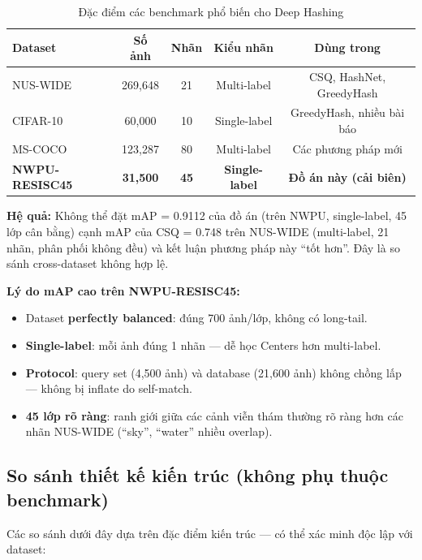 \documentclass[13pt,a4paper]{article}
\begin{document}
\begin{table}[H]
\centering
\caption{Đặc điểm các benchmark phổ biến cho Deep Hashing}
\label{tab:benchmark_comparison}
\begin{tabular}{lcccc}
\toprule
\textbf{Dataset} & \textbf{Số ảnh} & \textbf{Nhãn} & \textbf{Kiểu nhãn} & \textbf{Dùng trong}\\
\midrule
NUS-WIDE        & 269{,}648 & 21  & Multi-label & CSQ, HashNet, GreedyHash \\
CIFAR-10        & 60{,}000  & 10  & Single-label & GreedyHash, nhiều bài báo \\
MS-COCO         & 123{,}287 & 80  & Multi-label & Các phương pháp mới \\
\textbf{NWPU-RESISC45} & \textbf{31{,}500} & \textbf{45} & \textbf{Single-label} & \textbf{Đồ án này (cải biên)} \\
\bottomrule
\end{tabular}
\end{table}

\textbf{Hệ quả:} Không thể đặt mAP = 0.9112 của đồ án (trên NWPU, single-label, 45 lớp cân bằng) cạnh mAP của CSQ = 0.748 trên NUS-WIDE (multi-label, 21 nhãn, phân phối không đều) và kết luận phương pháp này ``tốt hơn''. Đây là so sánh cross-dataset không hợp lệ.

\textbf{Lý do mAP cao trên NWPU-RESISC45:}
\begin{itemize}
    \item Dataset \textbf{perfectly balanced}: đúng 700 ảnh/lớp, không có long-tail.
    \item \textbf{Single-label}: mỗi ảnh đúng 1 nhãn --- dễ học Centers hơn multi-label.
    \item \textbf{Protocol}: query set (4{,}500 ảnh) và database (21{,}600 ảnh) không chồng lấp --- không bị inflate do self-match.
    \item \textbf{45 lớp rõ ràng}: ranh giới giữa các cảnh viễn thám thường rõ ràng hơn các nhãn NUS-WIDE (``sky'', ``water'' nhiều overlap).
\end{itemize}


\subsection{So sánh thiết kế kiến trúc (không phụ thuộc benchmark)}

Các so sánh dưới đây dựa trên đặc điểm kiến trúc --- có thể xác minh độc lập với dataset:
\end{document}
